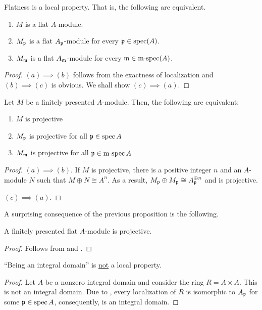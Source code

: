 \begin{proposition}
    Flatness is a local property. That is, the following are equivalent.
    \begin{enumerate}[label=(\alph*)]
        \item $M$ is a flat $A$-module. 
        \item $M_\mathfrak p$ is a flat $A_\mathfrak p$-module for every $\mathfrak p\in\operatorname{spec}(A)$. 
        \item $M_\mathfrak m$ is a flat $A_\mathfrak m$-module for every $\mathfrak m\in\operatorname{m-spec}(A)$.
    \end{enumerate}
\end{proposition}
\begin{proof}
    $(a)\implies(b)$ follows from the exactness of localization and $(b)\implies(c)$ is obvious. We shall show $(c)\implies(a)$.
\end{proof}

\begin{proposition}
    Let $M$ be a finitely presented $A$-module. Then, the following are equivalent: 
    \begin{enumerate}[label=(\alph*)]
        \item $M$ is projective
        \item $M_\mathfrak p$ is projective for all $\mathfrak p\in\operatorname{spec} A$ 
        \item $M_\mathfrak m$ is projective for all $\mathfrak p\in\operatorname{m-spec} A$ 
    \end{enumerate}
\end{proposition}
\begin{proof}
    $(a)\implies(b)$. If $M$ is projective, there is a positive integer $n$ and an $A$-module $N$ such that $M\oplus N\cong A^n$. As a result, $M_\mathfrak p\oplus M_\mathfrak p\cong A_\mathfrak p^{\oplus n}$ and is projective. 

    $(c)\implies(a)$. 
\end{proof}

A surprising consequence of the previous proposition is the following. 
\begin{proposition}
    A finitely presented flat $A$-module is projective.
\end{proposition}
\begin{proof}
    Follows from  and .
\end{proof}

\begin{proposition}
    ``Being an integral domain'' is \underline{not} a local property. 
\end{proposition}
\begin{proof}
    Let $A$ be a nonzero integral domain and consider the ring $R = A\times A$. This is not an integral domain. Due to , every localization of $R$ is isomorphic to $A_{\mathfrak p}$ for some $\mathfrak p\in\operatorname{spec} A$, consequently, is an integral domain. 
\end{proof}

